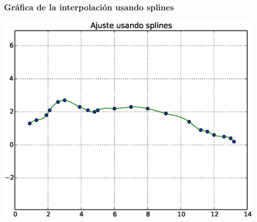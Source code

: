 \begin{frame}
\frametitle{Gráfica de la interpolación usando splines}
\includegraphics[scale=0.5]{Imagenes/Grafica10_02.eps} 
\end{frame}
